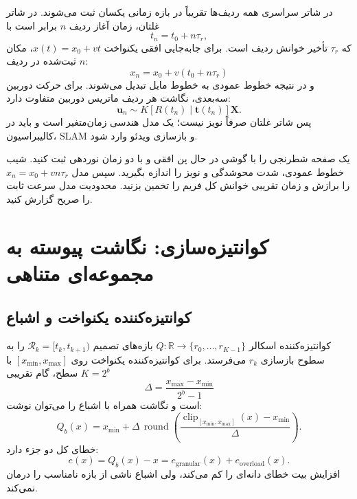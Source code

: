 \documentclass[12pt,openany,oneside]{book}
\newcommand{\R}{\mathbb{R}}
\newcommand{\vect}[1]{\bm{#1}}
\newcommand{\clip}{\operatorname{clip}}
\begin{document}
در شاتر سراسری همه ردیف‌ها تقریباً در بازه زمانی یکسان ثبت می‌شوند. در شاتر غلتان، زمان آغاز
ردیف \(n\) برابر است با
\begin{equation}
t_n=t_0+n\tau_r,
\end{equation}
که \(\tau_r\) تأخیر خوانش ردیف است. برای جابه‌جایی افقی یکنواخت \(x(t)=x_0+vt\)، مکان ثبت‌شده
در ردیف \(n\):
\begin{equation}
x_n=x_0+v(t_0+n\tau_r)
\end{equation}
و در نتیجه خطوط عمودی به خطوط مایل تبدیل می‌شوند. برای حرکت دوربین سه‌بعدی، نگاشت هر ردیف
ماتریس دوربین متفاوت دارد:
\begin{equation}
\vect u_n\sim K[R(t_n)\mid\vect t(t_n)]\vect X.
\end{equation}
پس شاتر غلتان صرفاً نویز نیست؛ یک مدل هندسی زمان‌متغیر است و باید در کالیبراسیون، SLAM و بازسازی
ویدئو وارد شود.

\begin{researchbox}
یک صفحه شطرنجی را با گوشی در حال پن افقی و با دو زمان نوردهی ثبت کنید. شیب خطوط عمودی، شدت
محوشدگی و نویز را اندازه بگیرید. سپس مدل \(x_n=x_0+vn\tau_r\) را برازش و زمان تقریبی خوانش کل
فریم را تخمین بزنید. محدودیت مدل سرعت ثابت را صریح گزارش کنید.
\end{researchbox}

\section{کوانتیزه‌سازی: نگاشت پیوسته به مجموعه‌ای متناهی}

\subsection{کوانتیزه‌کننده یکنواخت و اشباع}

کوانتیزه‌کننده اسکالر \(Q:\R\to\{r_0,\dots,r_{K-1}\}\) بازه‌های تصمیم
\(\mathcal R_k=[t_k,t_{k+1})\) را به سطوح بازسازی \(r_k\) می‌فرستد. برای کوانتیزه‌کننده یکنواخت
روی \([x_{\min},x_{\max}]\) با \(K=2^b\) سطح، گام تقریبی
\begin{equation}
\Delta=\frac{x_{\max}-x_{\min}}{2^b-1}
\end{equation}
است و نگاشت همراه با اشباع را می‌توان نوشت:
\begin{equation}
Q_b(x)=x_{\min}+\Delta\,
\operatorname{round}\!\left(
\frac{\clip_{[x_{\min},x_{\max}]}(x)-x_{\min}}{\Delta}
\right).
\end{equation}
خطای کل دو جزء دارد:
\begin{equation}
e(x)=Q_b(x)-x=e_{\mathrm{granular}}(x)+e_{\mathrm{overload}}(x).
\end{equation}
افزایش بیت خطای دانه‌ای را کم می‌کند، ولی اشباع ناشی از بازه نامناسب را درمان نمی‌کند.
\end{document}
